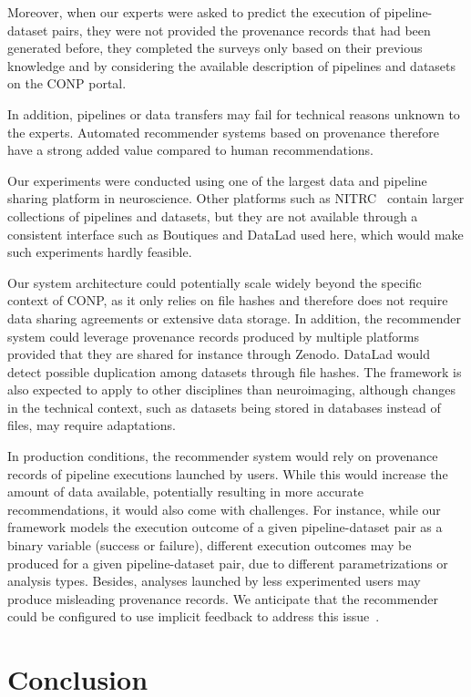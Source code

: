 Moreover, when our experts were asked to predict the execution of pipeline-dataset pairs, they were not provided the provenance records that had been generated before, they completed the surveys only based on their previous knowledge and by considering the available description of pipelines and datasets on the CONP portal. 

In addition, pipelines or data
transfers may fail for technical reasons unknown to the experts. Automated
recommender systems based on provenance therefore have a strong added value
compared to human recommendations. 

Our experiments were conducted using one of the largest data and pipeline
sharing platform in neuroscience. Other platforms such as
NITRC~\cite{kennedy2016nitrc} contain larger collections of
pipelines and datasets, but they are not available through a consistent
interface such as Boutiques and DataLad used here, which would make
such experiments hardly feasible.

Our system architecture could potentially scale widely beyond the specific
context of CONP, as it only relies on file hashes and therefore does not
require data sharing agreements or extensive data storage. In addition, the
recommender system could leverage provenance records produced by multiple
platforms provided that they are shared for instance through Zenodo.
DataLad would detect possible duplication among datasets through file hashes. 
The framework is also expected to apply to other disciplines than neuroimaging, 
although changes in the technical context, such as datasets being stored in 
databases instead of files, may require adaptations.

In production conditions, the recommender system would rely on provenance
records of pipeline executions launched by users. While this would increase
the amount of data available, potentially resulting in more accurate
recommendations, it would also come with challenges. For instance, while
our framework models the execution outcome of a given pipeline-dataset pair
as a binary variable (success or failure), different execution outcomes may
be produced for a given pipeline-dataset pair, due to different
parametrizations or analysis types. Besides, analyses launched by less
experimented users may produce misleading provenance records. We anticipate
that the recommender could be configured to use implicit feedback to address 
this issue~\cite{hu2008collaborative}.

\section{Conclusion}

